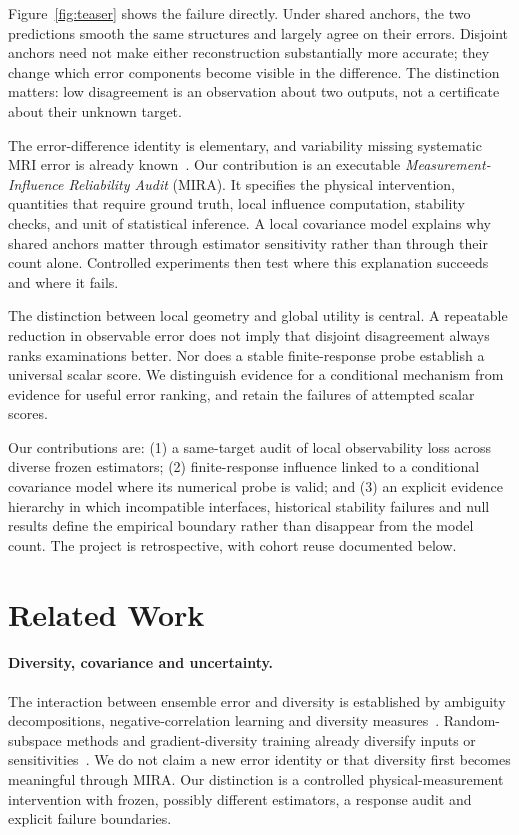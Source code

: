 \documentclass[10pt,twocolumn,letterpaper]{article}
\begin{document}
Figure~\ref{fig:teaser} shows the failure directly. Under shared anchors, the two predictions smooth the same structures and largely agree on their errors. Disjoint anchors need not make either reconstruction substantially more accurate; they change which error components become visible in the difference. The distinction matters: low disagreement is an observation about two outputs, not a certificate about their unknown target.

The error-difference identity is elementary, and variability missing systematic MRI error is already known~\cite{hu2021predict}. Our contribution is an executable \emph{Measurement-Influence Reliability Audit} (MIRA). It specifies the physical intervention, quantities that require ground truth, local influence computation, stability checks, and unit of statistical inference. A local covariance model explains why shared anchors matter through estimator sensitivity rather than through their count alone. Controlled experiments then test where this explanation succeeds and where it fails.

The distinction between local geometry and global utility is central. A repeatable reduction in observable error does not imply that disjoint disagreement always ranks examinations better. Nor does a stable finite-response probe establish a universal scalar score. We distinguish evidence for a conditional mechanism from evidence for useful error ranking, and retain the failures of attempted scalar scores.

Our contributions are: (1) a same-target audit of local observability loss across diverse frozen estimators; (2) finite-response influence linked to a conditional covariance model where its numerical probe is valid; and (3) an explicit evidence hierarchy in which incompatible interfaces, historical stability failures and null results define the empirical boundary rather than disappear from the model count. The project is retrospective, with cohort reuse documented below.

\section{Related Work}
\paragraph{Diversity, covariance and uncertainty.}
The interaction between ensemble error and diversity is established by ambiguity decompositions, negative-correlation learning and diversity measures~\cite{krogh1994ensembles,liu1999negative,kuncheva2003diversity,brown2005diversity,ortega2022diversity}. Random-subspace methods and gradient-diversity training already diversify inputs or sensitivities~\cite{ho1998subspace,kariyappa2019diversity}. We do not claim a new error identity or that diversity first becomes meaningful through MIRA. Our distinction is a controlled physical-measurement intervention with frozen, possibly different estimators, a response audit and explicit failure boundaries.
\end{document}
